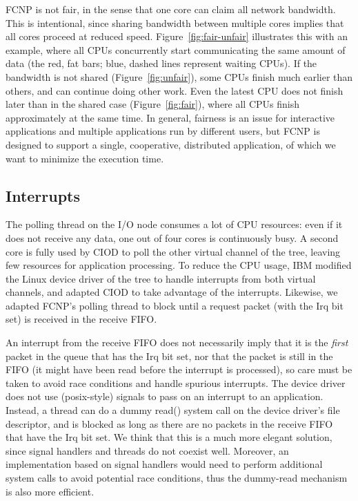 \documentclass[journal]{IEEEtran}
\begin{document}
FCNP is not fair, in the sense that one core can claim all network bandwidth.
This is intentional, since sharing bandwidth between multiple cores implies
that all cores proceed at reduced speed.
Figure~\ref{fig:fair-unfair} illustrates this with an example, where all
CPUs concurrently start communicating the same amount of data (the red, fat
bars; blue, dashed lines represent waiting CPUs).
If the bandwidth is not shared (Figure~\ref{fig:unfair}), some CPUs finish
much earlier than others, and can continue doing other work.
Even the latest CPU does not finish later than in the shared case
(Figure~\ref{fig:fair}), where all CPUs finish approximately at the same time.
In general, fairness is an issue for interactive applications and multiple
applications run by different users, but FCNP is designed to support a single,
cooperative, distributed application, of which we want to minimize the
execution time.


\subsection{Interrupts}
\label{sec:interrupts}

The polling thread on the I/O node consumes a lot of CPU resources: even if it
does not receive any data, one out of four cores is continuously busy.
A second core is fully used by CIOD to poll the other virtual channel of the
tree, leaving few resources for application processing.
To reduce the CPU usage, IBM modified the Linux device driver of the tree to
handle interrupts from both virtual channels, and adapted CIOD to take
advantage of the interrupts.
Likewise, we adapted FCNP's polling thread to block until a request packet
(with the Irq bit set) is received in the receive FIFO.

An interrupt from the receive FIFO does not necessarily imply that it is the
\emph{first\/} packet in the queue that has the Irq bit set, nor that the
packet is still in the FIFO (it might have been read before the interrupt is
processed), so care must be taken to avoid race conditions and handle spurious
interrupts.
The device driver does not use (posix-style) signals to pass on an interrupt
to an application.
Instead, a thread can do a dummy read() system call on the device driver's
file descriptor, and is blocked as long as there are no packets in the
receive FIFO that have the Irq bit set.
We think that this is a much more elegant solution, since signal handlers and
threads do not coexist well.
Moreover, an implementation based on signal handlers would need to perform
additional system calls to avoid potential race conditions, thus the dummy-read
mechanism is also more efficient.
\end{document}
